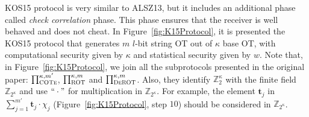 KOS15 protocol is very similar to ALSZ13, but it includes an additional phase called \textit{check correlation} phase. This phase ensures that the receiver is well behaved and does not cheat.  In Figure~\ref{fig:K15Protocol}, it is presented the KOS15 protocol that generates $m$ $l$-bit string OT out of $\kappa$ base OT, with computational security given by $\kappa$ and statistical security given by $w$. Note that, in Figure~\ref{fig:K15Protocol}, we join all the subprotocols presented in the original paper: $\prod^{\kappa, m'}_{\textsc{COTe}}$, $\prod^{\kappa, m}_{\textsc{ROT}}$ and $\prod^{\kappa, m}_{\textsc{DeROT}}$. Also, they identify $\mathbb{Z}^\kappa_2$ with the finite field $\mathbb{Z}_{2^\kappa}$ and use $``\cdot"$ for multiplication in $\mathbb{Z}_{2^\kappa}$. For example, the element $\boldsymbol{t}_j$ in $\sum_{j=1}^{m'} \boldsymbol{t}_j \cdot \chi_j$ (Figure~\ref{fig:K15Protocol}, step $10$) should be considered in $\mathbb{Z}_{2^\kappa}$.

